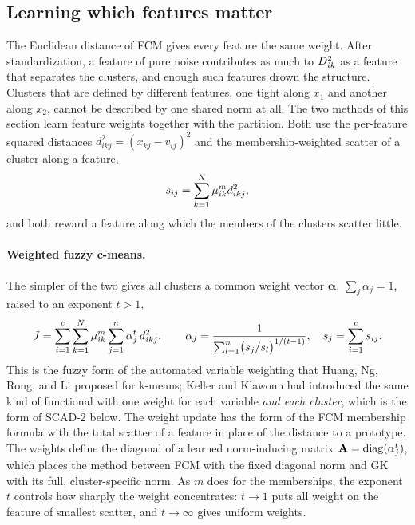 \subsection{Learning which features matter}\label{sec:robust:weights}

The Euclidean distance of FCM gives every feature the same weight. After standardization, a feature of pure noise contributes as much to $D^2_{ik}$ as a feature that separates the clusters, and enough such features drown the structure. Clusters that are defined by different features, one tight along $x_1$ and another along $x_2$, cannot be described by one shared norm at all. The two methods of this section learn feature weights together with the partition. Both use the per-feature squared distances $d^2_{ikj}=(x_{kj}-v_{ij})^2$ and the membership-weighted scatter of a cluster along a feature,
\begin{equation}
  s_{ij}=\sum_{k=1}^{N}\mu_{ik}^m d^2_{ikj},
  \label{eq:robust:featscatter}
\end{equation}
and both reward a feature along which the members of the clusters scatter little.

\paragraph{Weighted fuzzy c-means.} The simpler of the two gives all clusters a common weight vector $\boldsymbol\alpha$, $\sum_j\alpha_j=1$, raised to an exponent $t>1$,
\begin{equation}
  J=\sum_{i=1}^{c}\sum_{k=1}^{N}\mu_{ik}^m\sum_{j=1}^{n}\alpha_j^t\,d^2_{ikj},\qquad
  \alpha_j=\frac{1}{\sum_{l=1}^{n}\bigl(s_j/s_l\bigr)^{1/(t-1)}},\quad s_j=\sum_{i=1}^{c}s_{ij}.
  \label{eq:robust:wfcm}
\end{equation}
This is the fuzzy form of the automated variable weighting that Huang, Ng, Rong, and Li \cite{huang:2005:wkmeans} proposed for k-means; Keller and Klawonn \cite{keller:2000:weighting} had introduced the same kind of functional with one weight for each variable \emph{and each cluster}, which is the form of SCAD-2 below. The weight update has the form of the FCM membership formula with the total scatter of a feature in place of the distance to a prototype. The weights define the diagonal of a learned norm-inducing matrix $\mathbf{A}=\operatorname{diag}(\alpha_j^t)$, which places the method between FCM with the fixed diagonal norm and GK with its full, cluster-specific norm. As $m$ does for the memberships, the exponent $t$ controls how sharply the weight concentrates: $t\to1$ puts all weight on the feature of smallest scatter, and $t\to\infty$ gives uniform weights.

